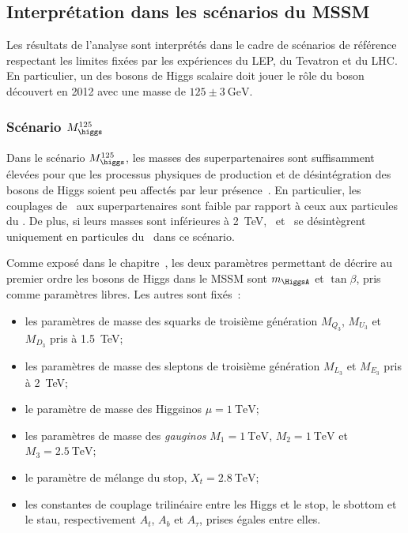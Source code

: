\subsection{Interprétation dans les scénarios du MSSM}\label{chapter-HTT_analysis-section-signal_extraction-benchmarks}
Les résultats de l'analyse sont interprétés dans le cadre de scénarios de référence~\cite{Bagnaschi_2019}
respectant les limites fixées par les expériences du LEP, du Tevatron et du LHC.
En particulier, un des bosons de Higgs scalaire doit jouer le rôle du boson découvert en 2012 avec une masse de $\num{125}\pm\SI{3}{\GeV}$.
\subsubsection{Scénario $M_{\higgs}^{125}$}\label{chapter-HTT_analysis-section-signal_extraction-benchmarks-mh125}
Dans le scénario $M_{\higgs}^{125}$,
les masses des superpartenaires sont suffisamment élevées
pour que les processus physiques de production et de désintégration
des bosons de Higgs soient peu affectés par leur présence~\cite{Bagnaschi_2019}.
En particulier, les couplages de \higgs\ aux superpartenaires
sont faible par rapport à ceux aux particules du \SM.
De plus, si leurs masses sont inférieures à \SI{2}{\TeV}, \Higgs\ et \HiggsA\ se désintègrent uniquement en particules du \SM\ dans ce scénario.
\par
Comme exposé dans le chapitre~,
les deux paramètres permettant de décrire au premier ordre les bosons de Higgs dans le MSSM
sont $m_{\HiggsA}$ et $\tan\beta$,
pris comme paramètres libres.
Les autres sont fixés~\cite{Bagnaschi_2019}:
\begin{itemize}
\item les paramètres de masse des squarks de troisième génération $M_{Q_3}$, $M_{U_3}$ et $M_{D_3}$ pris à \SI{1.5}{\TeV};
\item les paramètres de masse des sleptons de troisième génération $M_{L_3}$ et $M_{E_3}$ pris à \SI{2}{\TeV};
\item le paramètre de masse des Higgsinos $\mu=\SI{1}{\TeV}$;
\item les paramètres de masse des \emph{gauginos} $M_1=\SI{1}{\TeV}$, $M_2=\SI{1}{\TeV}$ et $M_3=\SI{2.5}{\TeV}$;
\item le paramètre de mélange du stop, $X_t=\SI{2.8}{\TeV}$;
\item les constantes de couplage trilinéaire entre les Higgs et le stop, le sbottom et le stau, respectivement $A_t$, $A_b$ et $A_\tau$, prises égales entre elles.
\end{itemize}

